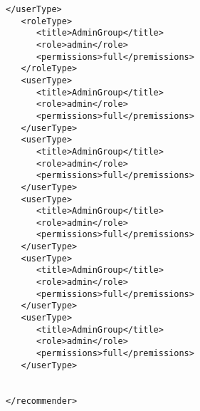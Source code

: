\begin{ListingEnv}[!h]
\begin{lstlisting}[language={[ISO]xml}]
   </userType>
   <roleType>
      <title>AdminGroup</title>
      <role>admin</role>
      <permissions>full</premissions>
   </roleType>
   <userType>
      <title>AdminGroup</title>
      <role>admin</role>
      <permissions>full</premissions>
   </userType>
   <userType>
      <title>AdminGroup</title>
      <role>admin</role>
      <permissions>full</premissions>
   </userType>
   <userType>
      <title>AdminGroup</title>
      <role>admin</role>
      <permissions>full</premissions>
   </userType>
   <userType>
      <title>AdminGroup</title>
      <role>admin</role>
      <permissions>full</premissions>
   </userType>
   <userType>
      <title>AdminGroup</title>
      <role>admin</role>
      <permissions>full</premissions>
   </userType>


</recommender>
    \end{lstlisting}
\end{ListingEnv}%


